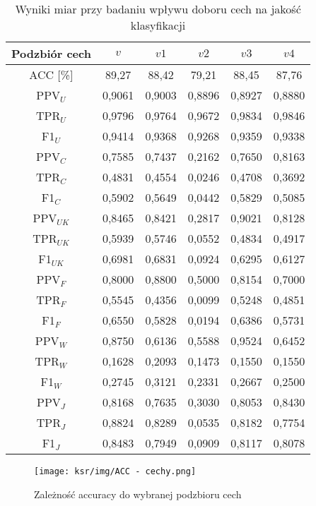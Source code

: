 \documentclass{article}
\begin{document}
\begin{table}[H]
    \centering
    \begin{tabular}{|c|c|c|c|c|c|}
    \hline
    \textbf{Podzbiór cech} & \textbf{\(v\)} & \textbf{\(v1\)} & \textbf{\(v2\)} & \textbf{\(v3\)} & \textbf{\(v4\)}  \\ \hline
    ACC [\%] & 89,27 & 88,42 & 79,21 & 88,45 & 87,76\\ \hline
    PPV\(_U\) & 0,9061 &0,9003& 0,8896 & 0,8927 & 0,8880 \\ \hline
    TPR\(_U\) & 0,9796 &0,9764 & 0,9672 & 0,9834 & 0,9846\\ \hline
    F1\(_U\)  & 0,9414 &0,9368 & 0,9268 & 0,9359 & 0,9338\\ \hline
    PPV\(_C\) & 0,7585 &0,7437 & 0,2162 & 0,7650 & 0,8163\\ \hline
    TPR\(_C\) & 0,4831 &0,4554 & 0,0246 & 0,4708 & 0,3692\\ \hline
    F1\(_C\) & 0,5902 &0,5649 & 0,0442 & 0,5829 & 0,5085\\ \hline
    PPV\(_{UK}\) & 0,8465 &0,8421 & 0,2817 & 0,9021 & 0,8128\\ \hline
    TPR\(_{UK}\) & 0,5939 &0,5746 & 0,0552 & 0,4834 & 0,4917\\ \hline
    F1\(_{UK}\) & 0,6981 &0,6831 & 0,0924 & 0,6295 & 0,6127\\ \hline
    PPV\(_F\) & 0,8000 &0,8800 & 0,5000 & 0,8154 & 0,7000\\ \hline
    TPR\(_F\) & 0,5545 &0,4356 & 0,0099 & 0,5248 & 0,4851\\ \hline
    F1\(_F\) & 0,6550 &0,5828 & 0,0194 & 0,6386 & 0,5731\\ \hline
    PPV\(_W\) & 0,8750 &0,6136 & 0,5588 & 0,9524 & 0,6452\\ \hline
    TPR\(_W\) & 0,1628 &0,2093 & 0,1473 & 0,1550 & 0,1550\\ \hline
    F1\(_W\) & 0,2745 &0,3121 & 0,2331 & 0,2667 & 0,2500\\ \hline
    PPV\(_J\) &  0,8168 &0,7635 & 0,3030 & 0,8053 & 0,8430\\ \hline
    TPR\(_J\) & 0,8824 &0,8289 & 0,0535 & 0,8182 & 0,7754\\ \hline
    F1\(_J\) & 0,8483 & 0,7949 & 0,0909 & 0,8117 & 0,8078\\ \hline
    \end{tabular}
    \caption{Wyniki miar przy badaniu wpływu doboru cech na jakość klasyfikacji}
\end{table}
\begin{figure}[H]
    \centering
    \texttt{[image: ksr/img/ACC - cechy.png]}
    \caption{Zależność accuracy do wybranej podzbioru cech}
    \label{fig:moj-obraz}
\end{figure}
\end{document}
